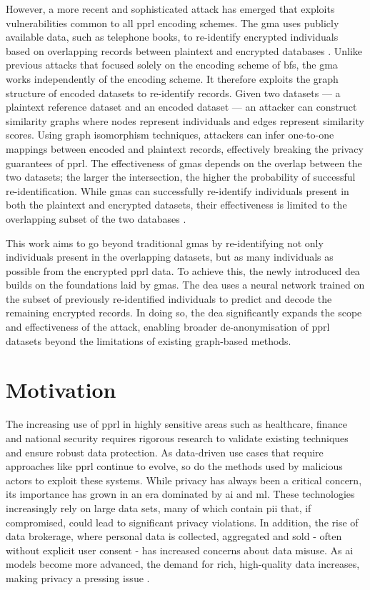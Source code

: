 However, a more recent and sophisticated attack has emerged that exploits vulnerabilities common to all \ac{pprl} encoding schemes. 
The \ac{gma} uses publicly available data, such as telephone books, to re-identify encrypted individuals based on overlapping records between plaintext and encrypted databases \cite{vidanage2020graph, schaefer2024}. 
Unlike previous attacks that focused solely on the encoding scheme of \ac{bf}s, the \ac{gma} works independently of the encoding scheme.
It therefore exploits the graph structure of encoded datasets to re-identify records. Given two datasets — a plaintext reference dataset and an encoded dataset — an attacker can construct similarity graphs where nodes represent individuals and edges represent similarity scores. 
Using graph isomorphism techniques, attackers can infer one-to-one mappings between encoded and plaintext records, effectively breaking the privacy guarantees of \ac{pprl}. 
The effectiveness of \ac{gma}s depends on the overlap between the two datasets; the larger the intersection, the higher the probability of successful re-identification. 
While \ac{gma}s can successfully re-identify individuals present in both the plaintext and encrypted datasets, their effectiveness is limited to the overlapping subset of the two databases \cite{schaefer2024}.

This work aims to go beyond traditional \ac{gma}s by re-identifying not only individuals present in the overlapping datasets, but as many individuals as possible from the encrypted \ac{pprl} data. 
To achieve this, the newly introduced \ac{dea} builds on the foundations laid by \ac{gma}s. 
The \ac{dea} uses a neural network trained on the subset of previously re-identified individuals to predict and decode the remaining encrypted records. 
In doing so, the \ac{dea} significantly expands the scope and effectiveness of the attack, enabling broader de-anonymisation of \ac{pprl} datasets beyond the limitations of existing graph-based methods.


\section{Motivation}  \label{sec:motivation}
The increasing use of \ac{pprl} in highly sensitive areas such as healthcare, finance and national security requires rigorous research to validate existing techniques and ensure robust data protection. 
As data-driven use cases that require approaches like \ac{pprl} continue to evolve, so do the methods used by malicious actors to exploit these systems.
While privacy has always been a critical concern, its importance has grown in an era dominated by \ac{ai} and \ac{ml}. 
These technologies increasingly rely on large data sets, many of which contain \ac{pii} that, if compromised, could lead to significant privacy violations. 
In addition, the rise of data brokerage, where personal data is collected, aggregated and sold - often without explicit user consent - has increased concerns about data misuse. 
As \ac{ai} models become more advanced, the demand for rich, high-quality data increases, making privacy a pressing issue \cite{ldc2024,cacgroup2024,arxiv2024}.

